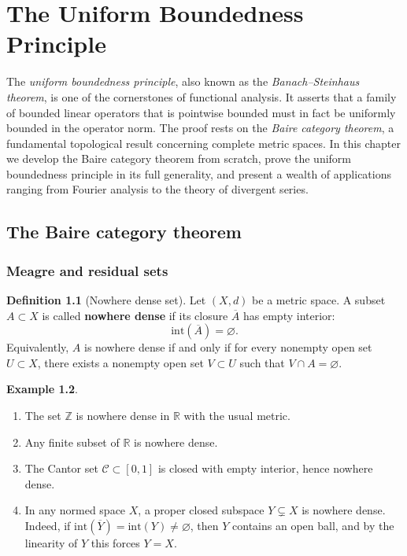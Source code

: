 \documentclass[a4paper,12pt]{book}
\newcommand{\Z}{\mathbb{Z}}
\newcommand{\R}{\mathbb{R}}
\theoremstyle{definition}
\newtheorem{definition}{Definition}[chapter]
\newtheorem{example}[definition]{Example}
\theoremstyle{plain}
\theoremstyle{remark}
\begin{document}
\chapter{The Uniform Boundedness Principle}\label{ch:ubp}
\minitoc

\vspace{1em}
\noindent
The \emph{uniform boundedness principle}, also known as the
\emph{Banach--Steinhaus theorem}, is one of the cornerstones
of functional analysis. It asserts that a family of bounded linear operators that is pointwise
bounded must in fact be uniformly bounded in the operator norm. The proof rests on the
\emph{Baire category theorem}, a fundamental topological result
concerning complete metric spaces. In this chapter we develop the Baire category theorem from
scratch, prove the uniform boundedness principle in its full generality, and present a wealth
of applications ranging from Fourier analysis to the theory of divergent series.

\section{The Baire category theorem}\label{sec:baire}

\subsection{Meagre and residual sets}\label{subsec:meagre}

\begin{definition}[Nowhere dense set]\label{def:nowhere-dense}
Let $(X,d)$ be a metric space. A subset $A \subset X$ is called
\textbf{nowhere dense} if its closure $\overline{A}$ has empty interior:
\[
  \mathrm{int}(\overline{A}) = \varnothing.
\]
Equivalently, $A$ is nowhere dense if and only if for every nonempty open set
$U \subset X$, there exists a nonempty open set $V \subset U$ such that
$V \cap A = \varnothing$.
\end{definition}

\begin{example}\label{ex:nowhere-dense-examples}
\begin{enumerate}[label=(\roman*)]
  \item The set $\Z$ is nowhere dense in $\R$ with the usual metric.
  \item Any finite subset of $\R$ is nowhere dense.
  \item The Cantor set $\mathcal{C} \subset [0,1]$ is closed with
    empty interior, hence nowhere dense.
  \item In any normed space $X$, a proper closed subspace $Y \subsetneq X$ is
    nowhere dense. Indeed, if $\mathrm{int}(\overline{Y}) = \mathrm{int}(Y) \neq \varnothing$,
    then $Y$ contains an open ball, and by the linearity of $Y$ this forces $Y = X$.
\end{enumerate}
\end{example}
\end{document}
